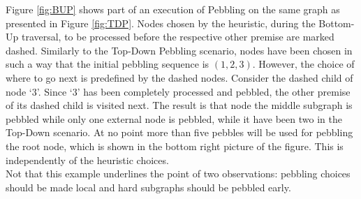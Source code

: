 \documentclass{llncs}
\newcommand{\nodedistance}{0.55cm}
\begin{document}
\begin{example}
Figure \ref{fig:BUP} shows part of an execution of  Pebbling on the same graph as presented in Figure \ref{fig:TDP}.
Nodes chosen by the heuristic, during the Bottom-Up traversal, to be processed before the respective other premise are marked dashed. Similarly to the Top-Down Pebbling scenario, nodes have been chosen in such a way that the initial pebbling sequence is $(1,2,3)$.
However, the choice of where to go next is predefined by the dashed nodes. Consider the dashed child of node `$3$'. Since `$3$' has been completely processed and pebbled, the other premise of its dashed child is visited next. The result is that node the middle subgraph is pebbled while only one external node is pebbled, while it have been two in the Top-Down scenario. At no point more than five pebbles will be used for pebbling the root node, which is shown in the bottom right picture of the figure. This is independently of the heuristic choices.\\
Not that this example underlines the point of two observations: pebbling choices should be made local and hard subgraphs should be pebbled early.


\end{example}
\end{document}
